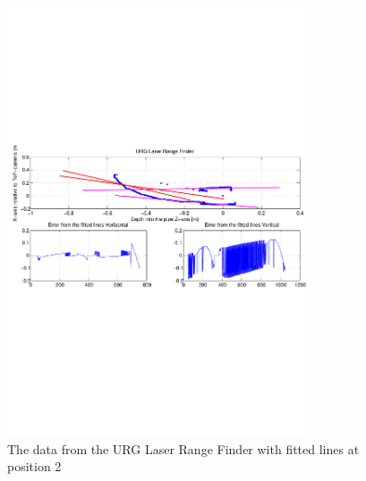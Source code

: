 \begin{figure}[htbp]
    \centering
    \includegraphics[width=0.8\textwidth]{pics/pos21-control-urg-2d}
    \caption{The data from the URG Laser Range Finder with fitted lines at position 2}
    \label{chap7:fig-pos21-control-urg-2d}
\end{figure}


